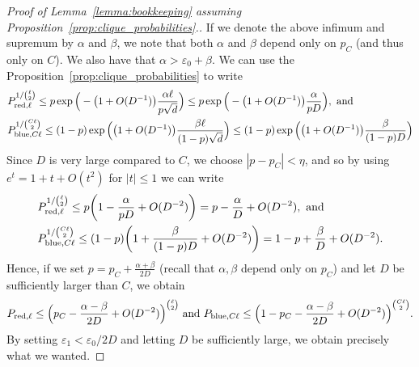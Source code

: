 \documentclass[11pt]{amsart}
\theoremstyle{definition}
\def\eps{\varepsilon}
\begin{document}
\begin{proof}[Proof of Lemma~\ref{lemma:bookkeeping} assuming Proposition~\ref{prop:clique_probabilities}.]
If we denote the above infimum and supremum by $\alpha$ and $\beta$, we note that both $\alpha$ and $\beta$ depend only on $p_C$ (and thus only on $C$). We also have that $\alpha>\eps_0+\beta$. We can use the Proposition~\ref{prop:clique_probabilities} to write
{\smaller[0.3]
\begin{align*}
    &P_{{\rm red}, \ell}^{1/\binom{\ell}{2}} \leq p \exp\Big(-\big(1+O(D^{-1})\big)\frac{\alpha \ell}{p\sqrt{d}}\Big)\leq p \exp\Big(-\big(1+O(D^{-1})\big)\frac{\alpha}{pD}\Big), \text{ and } \\
    &P_{{\rm blue}, C\ell}^{1/\binom{C\ell}{2}}\leq (1-p) \exp\Big(\big(1+O(D^{-1})\big)\frac{\beta \ell}{(1-p)\sqrt{d}}\Big)\leq (1-p) \exp\Big(\big(1+O(D^{-1})\big)\frac{\beta}{(1-p)D}\Big)
\end{align*}
}
Since $D$ is very large compared to $C$, we choose $|p-p_C|<\eta$, and so by using $e^t=1+t+O(t^2)$ for $|t|\leq 1$ we can write
{\smaller[0.3]
\begin{align*}
&P_{{\rm red}, \ell}^{1/\binom{\ell}{2}} \leq p\bigg(1-\frac{\alpha}{pD}+O(D^{-2})\bigg)=p-\frac{\alpha}{D}+O(D^{-2}), \text{ and }\\
&P_{{\rm blue}, C\ell}^{1/\binom{C\ell}{2}} \leq (1-p)\bigg(1+\frac{\beta}{(1-p)D}+O(D^{-2})\bigg)=1-p+\frac{\beta}{D}+O(D^{-2}).
\end{align*}
}
Hence, if we set $p=p_C+\frac{\alpha+\beta}{2D}$ (recall that $\alpha, \beta$ depend only on $p_C$) and let $D$ be sufficiently larger than $C$, we obtain
{\smaller[0.3]
\[P_{{\rm red}, \ell}\leq \Big(p_C-\frac{\alpha-\beta}{2D}+O(D^{-2})\Big)^{\binom{\ell}{2}} \text{ and } P_{{\rm blue}, C\ell}\leq \Big(1-p_C-\frac{\alpha-\beta}{2D}+O(D^{-2})\Big)^{\binom{C\ell}{2}}.\]
}
By setting $\eps_1<\eps_0/2D$ and letting $D$ be sufficiently large, we obtain precisely what we wanted.
\end{proof}
\end{document}
